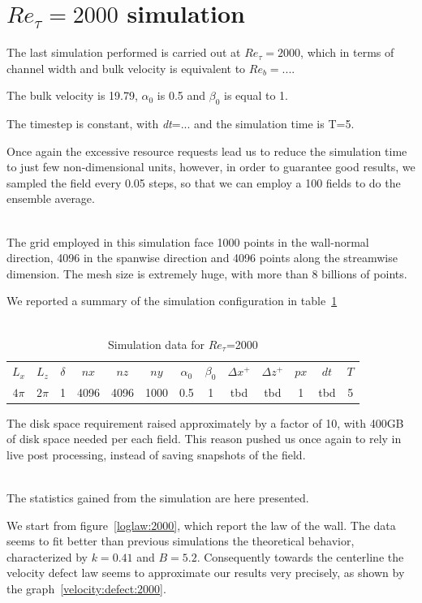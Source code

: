 \section{$Re_{\tau}=2000$ simulation} 
The last simulation performed is carried out at $Re_{\tau}=2000$, which in terms of channel width and bulk velocity is equivalent to $Re_{b}=...$.\par
The bulk velocity is 19.79, $\alpha_{0}$ is 0.5 and $\beta_{0}$ is equal to 1.\par
The timestep is constant, with \emph{dt}=... and the simulation time is T=5. \par
Once again the excessive resource requests lead us to reduce the simulation time to just few non-dimensional units, however, in order to guarantee good results, we sampled the field every 0.05 steps, so that we can employ a 100 fields to do the ensemble average.\\~\par
The grid employed in this simulation face 1000 points in the wall-normal direction, 4096 in the spanwise direction and 4096 points along the streamwise dimension. The mesh size is extremely huge, with more than 8 billions of points.\par
We reported a summary of the simulation configuration in table~\ref{table:2000}\\~\par

\begin{table}
\caption{Simulation data for $Re_{\tau}$=2000}
\begin{center}
\begin{tabular}{ccccccccccccc}
\toprule
$L_{x}$ & $L_{z}$ & $\delta$ & $nx$ & $nz$ & $ny$ & $\alpha_{0}$ & $\beta_{0}$ & $\Delta x^{+}$ & $\Delta z^{+}$ & $px$ & $dt$ & $T$\\
$4\pi$ & $2\pi$ & 1 & 4096 & 4096 & 1000 & 0.5 & 1 & tbd  & tbd & 1 & tbd & 5 \\
\bottomrule
\end{tabular}
\end{center}
\label{table:2000}
\end{table}


The disk space requirement raised approximately by a factor of 10, with 400GB of disk space needed per each field. This reason pushed us once again to rely in live post processing, instead of saving snapshots of the field.\\~\par

The statistics gained from the simulation are here presented.\par
We start from figure~\ref{loglaw:2000}, which report the law of the wall. The data seems to fit better than previous simulations the theoretical behavior, characterized by $k=0.41$ and $B=5.2$.
Consequently towards the centerline the velocity defect law seems to approximate our results very precisely, as shown by the graph~\ref{velocity:defect:2000}.\\~\par

